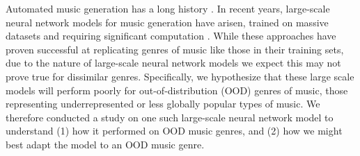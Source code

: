 \documentclass[letterpaper]{article}
\begin{document}
Automated music generation has a long history \cite{briot2017deepSurvey}. In recent years, large-scale neural network models for music generation have arisen, trained on massive datasets and requiring significant computation \cite{CIVIT2022118190}. 
While these approaches have proven successful at replicating genres of music like those in their training sets, due to the nature of large-scale neural network models we expect this may not prove true for dissimilar genres. 
Specifically, we hypothesize that these large scale models will perform poorly for out-of-distribution (OOD) genres of music, those representing underrepresented or less globally popular types of music. 
We therefore conducted a study on one such large-scale neural network model to understand (1) how it performed on OOD music genres, and (2) how we might best adapt the model to an OOD music genre.

\end{document}
